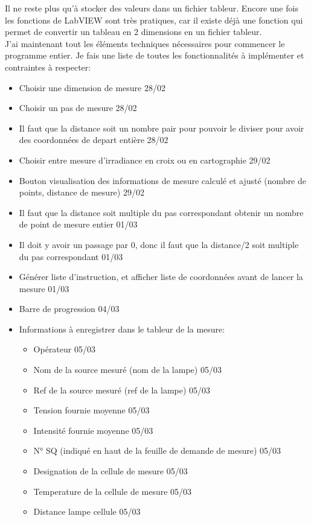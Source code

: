 \documentclass[12pt]{article}
\begin{document}
Il ne reste plus qu'à stocker des valeurs dans un fichier tableur.
Encore une fois les fonctions de LabVIEW sont très pratiques, car il existe déjà une fonction qui permet de convertir un tableau en 2 dimensions en un fichier tableur.\\
J'ai maintenant tout les éléments techniques nécessaires pour commencer le programme entier.
Je fais une liste de toutes les fonctionnalités à implémenter et contraintes à respecter:
\begin{itemize}
	\item  Choisir une dimension de mesure  28/02
	\item  Choisir un pas de mesure  28/02
	\item  Il faut que la distance soit un nombre pair pour pouvoir le diviser pour avoir des coordonnées de depart entière  28/02
	\item  Choisir entre mesure d'irradiance en croix ou en cartographie 29/02
	\item  Bouton visualisation des informations de mesure calculé et ajusté (nombre de points, distance de mesure)  29/02
	\item  Il faut que la distance soit multiple du pas correspondant obtenir un nombre de point de mesure entier  01/03
	\item  Il doit y avoir un passage par 0, donc il faut que la distance/2 soit multiple du pas correspondant  01/03
	\item  Générer liste d'instruction, et afficher liste de coordonnées avant de lancer la mesure  01/03
	\item  Barre de progression  04/03
	\item  Informations à enregistrer dans le tableur de la mesure:
		\begin{itemize}
	\item  Opérateur  05/03
	\item  Nom de la source mesuré (nom de la lampe)  05/03
	\item  Ref de la source mesuré (ref de la lampe)  05/03
	\item  Tension fournie moyenne  05/03
	\item  Intensité fournie moyenne  05/03
	\item  N° SQ (indiqué en haut de la feuille de demande de mesure)  05/03
	\item  Designation de la cellule de mesure  05/03
	\item  Temperature de la cellule de mesure  05/03
	\item  Distance lampe cellule  05/03

\end{itemize}
\end{itemize}
\end{document}
